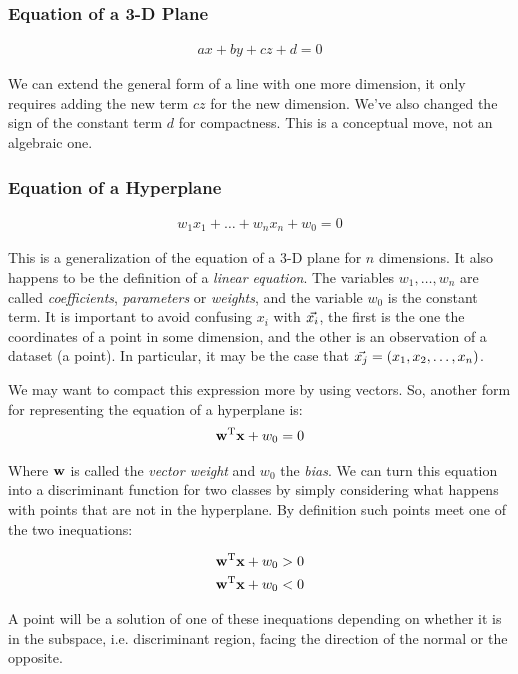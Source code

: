 \subsubsection*{Equation of a 3-D Plane}
\begin{align}
    ax + by + cz + d = 0
\end{align}

We can extend the general form of a line with one more dimension, it only requires adding the new term $cz$ for the new dimension. We've also changed the sign of the constant term $d$ for compactness. This is a conceptual move, not an algebraic one.

\subsubsection*{Equation of a Hyperplane}
\begin{align}
    w_1x_1 + \dots + w_nx_n + w_0 = 0
\end{align}

This is a generalization of the equation of a 3-D plane for $n$ dimensions. It also happens to be the definition of a \emph{linear equation}. The variables $w_1, \dots, w_n$ are called \emph{coefficients}, \emph{parameters} or \emph{weights}, and the variable $w_0$ is the constant term. It is important to avoid confusing $x_i$ with $\vec{x_i}$, the first is the one the coordinates of a point in some dimension, and the other is an observation of a dataset (a point). In particular, it may be the case that $\vec{x_j} = (x_1, x_2, \dots, x_n)$.

We may want to compact this expression more by using vectors. So, another form for representing the equation of a hyperplane is:
\begin{align}
    \mathbf{w}^{\text{T}}\mathbf{x} + w_0 = 0
\end{align}

Where $\mathbf{w}$ is called the \emph{vector weight} and $w_0$ the \emph{bias}. We can turn this equation into a discriminant function for two classes by simply considering what happens with points that are not in the hyperplane. By definition such points meet one of the two inequations:

\begin{align}
    \mathbf{w}^{\text{T}}\mathbf{x} + w_0 > 0 \\
    \mathbf{w}^{\text{T}}\mathbf{x} + w_0 < 0
\end{align}

A point will be a solution of one of these inequations depending on whether it is in the subspace, i.e. discriminant region, facing the direction of the normal or the opposite.

